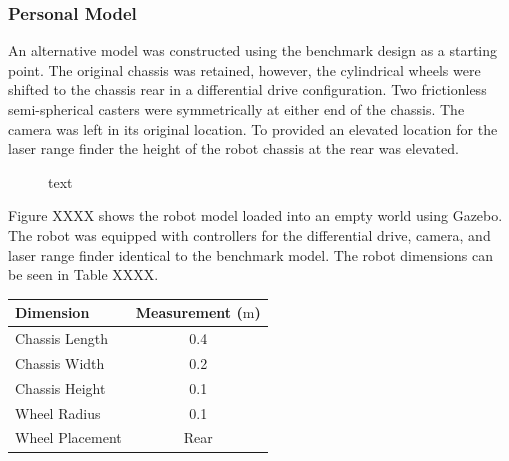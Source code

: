 \documentclass[a4paper]{article}
\begin{document}
\subsubsection{Personal Model}
An alternative model was constructed using the benchmark design as a starting point. The original chassis was retained, however, the cylindrical wheels were shifted to the chassis rear in a differential drive configuration. Two frictionless semi-spherical casters were symmetrically at either end of the chassis. The camera was left in its original location. To provided an elevated location for the laser range finder the height of the robot chassis at the rear was elevated.
\begin{figure}[h]
\centering
{}
\caption{text}
\end{figure}

\begin{minipage}{0.45\textwidth}
Figure XXXX shows the robot model loaded into an empty world using Gazebo. The robot was equipped with controllers for the differential drive, camera, and laser range finder identical to the benchmark model. The robot dimensions can be seen in Table XXXX.
\end{minipage}
\hspace{1cm}
\begin{minipage}{0.45\textwidth}
\centering
{}
\begin{tabular}{lc}
\toprule
\textbf{Dimension} & \textbf{Measurement ($\si{\meter}$)} \\
\midrule
Chassis Length & 0.4\\
Chassis Width & 0.2\\
Chassis Height & 0.1\\
Wheel Radius & 0.1\\
Wheel Placement & Rear\\
\bottomrule
\end{tabular}
\end{minipage}
\end{document}
